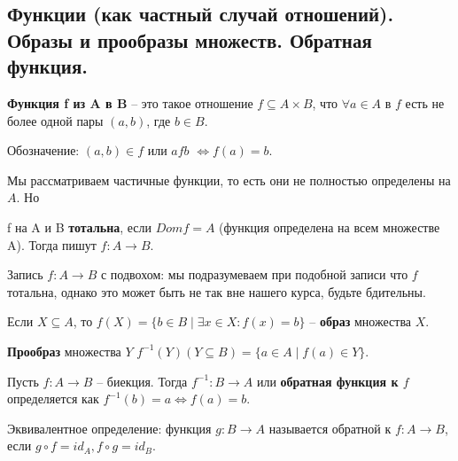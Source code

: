 \subsection{Функции (как частный случай отношений). Образы и прообразы множеств. Обратная функция.}

\textbf{Функция f из A в B} -- это такое отношение $f \subseteq A \times B$, что $\forall a \in A$ в $f$ есть не более одной пары $(a, b)$, где $b \in B$.

Обозначение: $(a, b) \in f$ или $afb$ $\Leftrightarrow f(a) = b$.

Мы рассматриваем частичные функции, то есть они не полностью определены на $A$. Но

f на A и B \textbf{тотальна}, если $Dom f = A$ (функция определена на всем множестве A). Тогда пишут $f: A \rightarrow B$.

Запись $f: A \rightarrow B$ с подвохом: мы подразумеваем при подобной записи что $f$ тотальна, однако это может быть не так вне нашего курса, будьте бдительны.

Если $X \subseteq A$, то $f(X) = \{b \in B \mid \exists x \in X: f(x) = b\}$ -- \textbf{образ} множества $X$.

\textbf{Прообраз} множества $Y$ $f^{-1}(Y) (Y \subseteq B) = \{a \in A \mid f(a) \in Y\}$.

Пусть $f: A \rightarrow B$ -- биекция. Тогда $f^{-1}: B \rightarrow A$ или \textbf{обратная функция к $f$} определяется как $f^{-1}(b) = a \Leftrightarrow f(a) = b$.

Эквивалентное определение: функция $g : B \to A$ называется обратной к $f : A \to B$, если $g \circ f = id_A, f \circ g = id_B$. 
